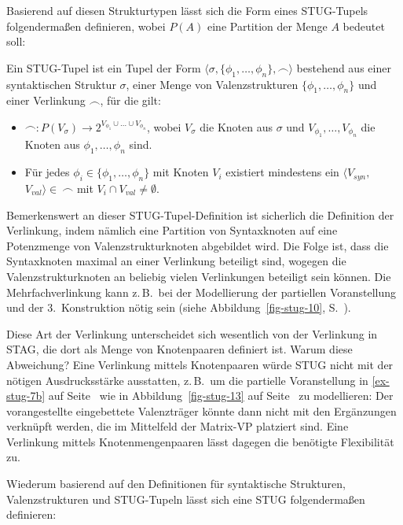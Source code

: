 Basierend auf diesen Strukturtypen lässt sich die Form eines STUG-Tupels folgenderma\ss en definieren, wobei $P(A)$ eine Partition der Menge $A$ bedeutet soll:

\begin{definition}
Ein STUG-Tupel ist ein Tupel der Form $\langle \sigma,\{\phi_1,$\linebreak $\ldots,\phi_n\}, \frown\rangle$ bestehend aus einer syntaktischen Struktur $\sigma$, einer Menge von Valenzstrukturen $\{\phi_1,\ldots,\phi_n\}$ und einer Verlinkung $\frown$, für die gilt:
\begin{itemize}
  \item $\frown: P(V_\sigma) \to 2^{V_{\phi_1} \cup \ldots \cup V_{\phi_n}}$, wobei $V_\sigma$ die Knoten aus $\sigma$ und $V_{\phi_1}, \ldots, V_{\phi_n}$ die Knoten aus $\phi_1,\ldots,\phi_n$ sind.
  \item Für jedes $\phi_i \in \{\phi_1,\ldots,\phi_n\}$ mit Knoten $V_i$ existiert mindestens ein $\langle V_{syn},$ $V_{val}\rangle \in \ \frown$ mit $V_i \cap V_{val} \ne \emptyset$.
\end{itemize}
\end{definition}
Bemerkenswert an dieser STUG-Tupel-Definition ist sicherlich die Definition der Verlinkung, indem nämlich eine Partition von Syntaxknoten auf eine Potenzmenge von Valenzstrukturknoten abgebildet wird. Die Folge ist, dass die Syntaxknoten maximal an einer Verlinkung beteiligt sind, wogegen die Valenzstrukturknoten an beliebig vielen Verlinkungen beteiligt sein können. Die Mehrfachverlinkung kann z.\,B.\ bei der Modellierung der partiellen Voranstellung und der 3.~Konstruktion nötig sein (siehe Abbildung~\ref{fig-stug-10}, S.~\pageref{fig-stug-10}).     

Diese Art der Verlinkung unterscheidet sich wesentlich von der Verlinkung in STAG, die dort als Menge von Knotenpaaren definiert ist. Warum diese Abweichung? Eine Verlinkung mittels Knotenpaaren würde STUG nicht mit der nötigen Ausdrucksstärke ausstatten, z.\,B.\ um die partielle Voranstellung in \ref{ex-stug-7b} auf Seite~\pageref{ex-stug-7b} wie in Abbildung~\ref{fig-stug-13} auf Seite~\pageref{fig-stug-13} zu modellieren: Der vorangestellte eingebettete Valenzträger könnte dann nicht mit den Ergänzungen verknüpft werden, die im Mittelfeld der Matrix-VP platziert sind. Eine Verlinkung mittels Knotenmengenpaaren lässt dagegen die benötigte Flexibilität zu.   

Wiederum basierend auf den Definitionen für syntaktische Strukturen, Valenzstrukturen und STUG-Tupeln lässt sich eine STUG folgenderma\ss en definieren:

